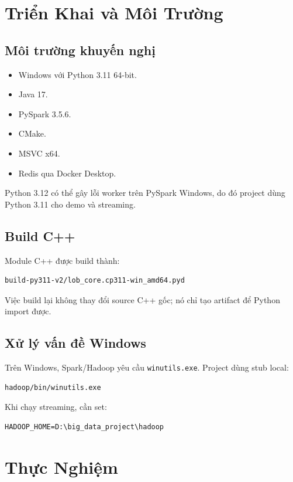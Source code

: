 \documentclass[12pt,a4paper]{report}
\begin{document}
\chapter{Triển Khai và Môi Trường}

\section{Môi trường khuyến nghị}

\begin{itemize}
    \item Windows với Python 3.11 64-bit.
    \item Java 17.
    \item PySpark 3.5.6.
    \item CMake.
    \item MSVC x64.
    \item Redis qua Docker Desktop.
\end{itemize}

Python 3.12 có thể gây lỗi worker trên PySpark Windows, do đó project dùng Python 3.11 cho demo và streaming.

\section{Build C++}

Module C++ được build thành:

\begin{lstlisting}
build-py311-v2/lob_core.cp311-win_amd64.pyd
\end{lstlisting}

Việc build lại không thay đổi source C++ gốc; nó chỉ tạo artifact để Python import được.

\section{Xử lý vấn đề Windows}

Trên Windows, Spark/Hadoop yêu cầu \texttt{winutils.exe}. Project dùng stub local:

\begin{lstlisting}
hadoop/bin/winutils.exe
\end{lstlisting}

Khi chạy streaming, cần set:

\begin{lstlisting}
HADOOP_HOME=D:\big_data_project\hadoop
\end{lstlisting}

\chapter{Thực Nghiệm}
\end{document}
